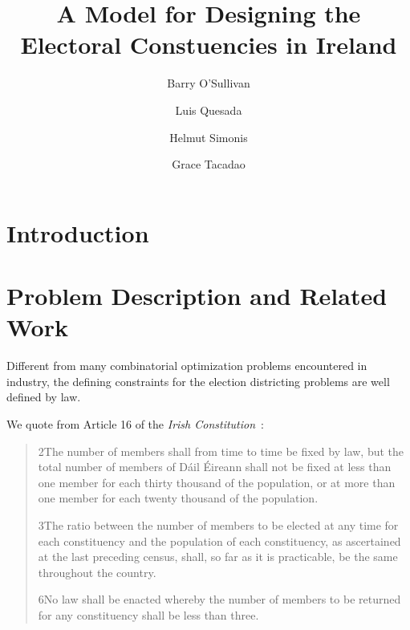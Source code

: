 \documentclass[runningheads]{llncs}
\begin{document}
\title{A Model for Designing the Electoral Constuencies in Ireland}

\author{Barry O'Sullivan  \and Luis Quesada \and  Helmut Simonis \and Grace Tacadao}

\authorrunning{}


\maketitle              

\begin{abstract}

\end{abstract}



\section{Introduction}
\label{sec:introduction}


\section{Problem Description and Related Work}
\label{sec:problem}

Different from many combinatorial optimization problems encountered in industry, the defining constraints for the election districting problems are well defined by law. 

We quote from Article 16 of the \emph{Irish Constitution}~\cite{Ireland2020}:
\begin{quote}
2\textdegree The number of members shall from time to time be fixed by law, but the total number of members of Dáil Éireann shall not be fixed at less than one member for each thirty thousand of the population, or at more than one member for each twenty thousand of the population.

3\textdegree The ratio between the number of members to be elected at any time for each constituency and the population of each constituency, as ascertained at the last preceding census, shall, so far as it is practicable, be the same throughout the country.

6\textdegree No law shall be enacted whereby the number of members to be returned for any constituency shall be less than three.
\end{quote}
\end{document}
